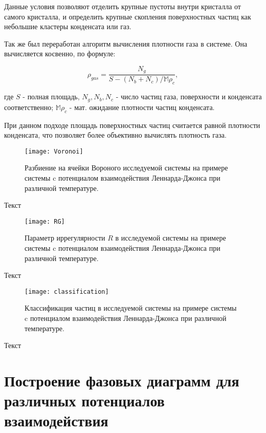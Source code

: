 Данные условия позволяют отделить крупные пустоты внутри кристалла от самого кристалла, и определить крупные скопления поверхностных частиц как небольшие кластеры конденсата или газ.


Так же был переработан алгоритм вычисления плотности газа в системе. Она вычисляется косвенно, по формуле:

\begin{equation}
\rho_{gas} = \frac{N_{g}}{S - (N_{b} + N_{c}) / \mathbb{M}\rho_c},
\label{eqGas}
\end{equation}

где $S$ - полная площадь, $N_g, N_b, N_c$ - число частиц газа, поверхности и конденсата соответственно; $\mathbb{M}\rho_c$ - мат. ожидание плотности частиц конденсата.

При данном подходе площадь поверхностных частиц считается равной плотности конденсата, что позволяет более объективно вычислять плотность газа.


\begin{figure}[htbp!]
\begin{center}
\texttt{[image: Voronoi]}
\caption{Разбиение на ячейки Вороного исследуемой системы на примере системы c потенциалом взаимодействия Леннарда-Джонса при различной температуре.}
\label{ris5}
\end{center}
\end{figure}

Текст

\begin{figure}[htbp!]
\begin{center}
\texttt{[image: RG]}
\caption{Параметр иррегулярности $R$ в исследуемой системы на примере системы c потенциалом взаимодействия Леннарда-Джонса при различной температуре.}
\label{ris6}
\end{center}
\end{figure}

Текст

\begin{figure}[htbp!]
\begin{center}
\texttt{[image: classification]}
\caption{Классификация частиц в исследуемой системы на примере системы c потенциалом взаимодействия Леннарда-Джонса при различной температуре.}
\label{ris7}
\end{center}
\end{figure}

Текст

\section{Построение фазовых диаграмм для различных потенциалов взаимодействия}\label{C2_2}

